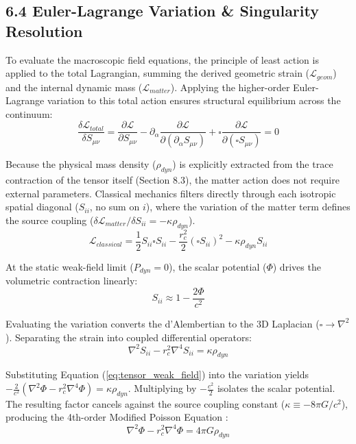 
\subsection*{6.4 Euler-Lagrange Variation \& Singularity Resolution}
To evaluate the macroscopic field equations, the principle of least action is applied to the total Lagrangian, summing the derived geometric strain ($\mathcal{L}_{geom}$) and the internal dynamic mass ($\mathcal{L}_{matter}$). Applying the higher-order Euler-Lagrange variation to this total action ensures structural equilibrium across the continuum: 
\begin{equation}
    \frac{\delta \mathcal{L}_{total}}{\delta S_{\mu\nu}} = \frac{\partial \mathcal{L}}{\partial S_{\mu\nu}} - \partial_\alpha \frac{\partial \mathcal{L}}{\partial (\partial_\alpha S_{\mu\nu})} + \square \frac{\partial \mathcal{L}}{\partial (\square S_{\mu\nu})} = 0
\end{equation}

Because the physical mass density ($\rho_{dyn}$) is explicitly extracted from the trace contraction of the tensor itself (Section 8.3), the matter action does not require external parameters. Classical mechanics filters directly through each isotropic spatial diagonal ($S_{ii}$, no sum on $i$), where the variation of the matter term defines the source coupling ($\delta \mathcal{L}_{matter}/\delta S_{ii} = -\kappa \rho_{dyn}$). %
\begin{equation}
    \mathcal{L}_{classical} = \frac{1}{2} S_{ii} \square S_{ii} - \frac{r_c^2}{2} (\square S_{ii})^2 - \kappa \rho_{dyn} S_{ii} 
\end{equation}

At the static weak-field limit ($P_{dyn} = 0$), the scalar potential ($\Phi$) drives the volumetric contraction linearly:
\begin{equation}
    S_{ii} \approx 1 - \frac{2\Phi}{c^2} \label{eq:tensor_weak_field}
\end{equation}

Evaluating the variation converts the d'Alembertian to the 3D Laplacian ($\square \to \nabla^2$). Separating the strain into coupled differential operators:
\begin{equation}
    \nabla^2 S_{ii} - r_c^2 \nabla^4 S_{ii} = \kappa \rho_{dyn} 
\end{equation}

Substituting Equation (\ref{eq:tensor_weak_field}) into the variation yields $-\frac{2}{c^2}(\nabla^2 \Phi - r_c^2 \nabla^4 \Phi) = \kappa \rho_{dyn}$. Multiplying by $-\frac{c^2}{2}$ isolates the scalar potential. The resulting factor cancels against the source coupling constant ($\kappa \equiv -8\pi G / c^2$), producing the 4th-order Modified Poisson Equation \cite{Podolsky1942, Stelle1977}: 
\begin{equation}
    \nabla^2 \Phi - r_c^2 \nabla^4 \Phi = 4\pi G \rho_{dyn} \label{eq:4th_order_poisson}
\end{equation}

